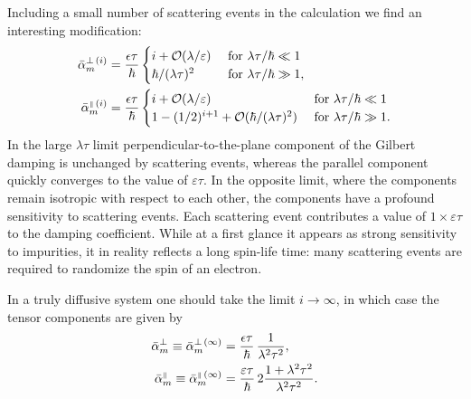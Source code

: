 Including a small number of scattering events in the calculation we find an interesting modification:
\begin{align}
	\label{eq:perpi}
    \bar{\alpha}_{m}^{\perp\,(i)}  & = \frac{\epsilon\tau}{\hbar}\begin{cases}
    i + \mathcal{O}(\lambda/\varepsilon)  & \text{ for }\lambda\tau/\hbar\ll1\\
    \hbar/(\lambda\tau)^2 & \text{ for }\lambda\tau/\hbar\gg1,
    \end{cases}\\
    \label{eq:parai}
    \bar{\alpha}_{m}^{{\scriptscriptstyle\parallel}\,(i)}  &  = \frac{\epsilon\tau}{\hbar}\begin{cases}
    i + \mathcal{O}(\lambda/\varepsilon)  & \text{ for }\lambda\tau/\hbar\ll1\\
    1-(1/2)^{i+1}+\mathcal{O}(\hbar/(\lambda\tau)^2) & \text{ for }\lambda\tau/\hbar\gg1.
    \end{cases}
\end{align}
In the large $\lambda\tau$ limit perpendicular-to-the-plane component of the Gilbert damping is unchanged by scattering events, whereas the parallel component quickly converges to the value of $\varepsilon\tau$. In the opposite limit, where the components remain isotropic with respect to each other, the components have a profound sensitivity to scattering events. Each scattering event contributes a value of $1\times\varepsilon\tau$ to the damping coefficient. While at a first glance it appears as strong sensitivity to impurities, it in reality reflects a long spin-life time: many scattering events are required to randomize the spin of an electron. 

In a truly diffusive system one should take the limit $i\rightarrow\infty$, in which case the tensor components are given by
\begin{align}
\label{eq:alphaperpzerodelta}
    \bar{\alpha}_{m}^{\perp}\equiv\bar{\alpha}_{m}^{\perp\,(\infty)}  & = \frac{\epsilon \tau}{\hbar}\, \frac{1}{\lambda^2\tau^2},\\
  \label{eq:alphaparallelzerodelta}  \bar{\alpha}_{m}^{{\scriptscriptstyle\parallel}}\equiv\bar{\alpha}_{m}^{{\scriptscriptstyle\parallel}\,(\infty)}  & = \frac{\varepsilon\tau}{\hbar}\,2\frac{1+\lambda^2\tau^2}{\lambda^2\tau^2}.
\end{align}

